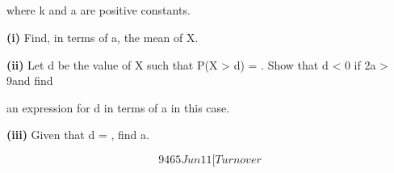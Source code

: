 \documentclass[12pt]{article}
\begin{document}
\begin{flushleft}
\par
\par
\par
\par
where k and a are positive constants.\par
\textbf{(i)} Find, in terms of a, the mean of X.\par
\textbf{(ii)} Let d be the value of X such that P(X > d) = . Show that d < 0 if 2a > 9\pi and find\par
an expression for d in terms of a in this case.\par
\textbf{(iii)} Given that d = , find a.\par
\[9465 Jun11 [Turn over\]
\end{flushleft}
\end{document}
